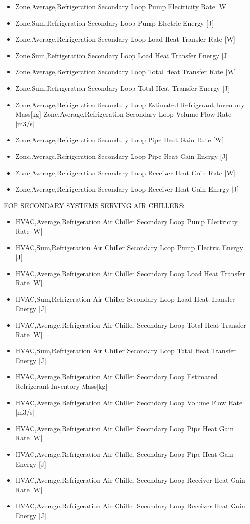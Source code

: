 \begin{itemize}
\item
  Zone,Average,Refrigeration Secondary Loop Pump Electricity Rate {[}W{]}
\item
  Zone,Sum,Refrigeration Secondary Loop Pump Electric Energy {[}J{]}
\item
  Zone,Average,Refrigeration Secondary Loop Load Heat Transfer Rate {[}W{]}
\item
  Zone,Sum,Refrigeration Secondary Loop Load Heat Transfer Energy {[}J{]}
\item
  Zone,Average,Refrigeration Secondary Loop Total Heat Transfer Rate {[}W{]}
\item
  Zone,Sum,Refrigeration Secondary Loop Total Heat Transfer Energy {[}J{]}
\item
  Zone,Average,Refrigeration Secondary Loop Estimated Refrigerant Inventory Mass{[}kg{]} Zone,Average,Refrigeration Secondary Loop Volume Flow Rate {[}m3/s{]}
\item
  Zone,Average,Refrigeration Secondary Loop Pipe Heat Gain Rate {[}W{]}
\item
  Zone,Average,Refrigeration Secondary Loop Pipe Heat Gain Energy {[}J{]}
\item
  Zone,Average,Refrigeration Secondary Loop Receiver Heat Gain Rate {[}W{]}
\item
  Zone,Average,Refrigeration Secondary Loop Receiver Heat Gain Energy {[}J{]}
\end{itemize}

FOR SECONDARY SYSTEMS SERVING AIR CHILLERS:

\begin{itemize}
\item
  HVAC,Average,Refrigeration Air Chiller Secondary Loop Pump Electricity Rate {[}W{]}
\item
  HVAC,Sum,Refrigeration Air Chiller Secondary Loop Pump Electric Energy {[}J{]}
\item
  HVAC,Average,Refrigeration Air Chiller Secondary Loop Load Heat Transfer Rate {[}W{]}
\item
  HVAC,Sum,Refrigeration Air Chiller Secondary Loop Load Heat Transfer Energy {[}J{]}
\item
  HVAC,Average,Refrigeration Air Chiller Secondary Loop Total Heat Transfer Rate {[}W{]}
\item
  HVAC,Sum,Refrigeration Air Chiller Secondary Loop Total Heat Transfer Energy {[}J{]}
\item
  HVAC,Average,Refrigeration Air Chiller Secondary Loop Estimated Refrigerant Inventory Mass{[}kg{]}
\item
  HVAC,Average,Refrigeration Air Chiller Secondary Loop Volume Flow Rate {[}m3/s{]}
\item
  HVAC,Average,Refrigeration Air Chiller Secondary Loop Pipe Heat Gain Rate {[}W{]}
\item
  HVAC,Average,Refrigeration Air Chiller Secondary Loop Pipe Heat Gain Energy {[}J{]}
\item
  HVAC,Average,Refrigeration Air Chiller Secondary Loop Receiver Heat Gain Rate {[}W{]}
\item
  HVAC,Average,Refrigeration Air Chiller Secondary Loop Receiver Heat Gain Energy {[}J{]}
\end{itemize}

